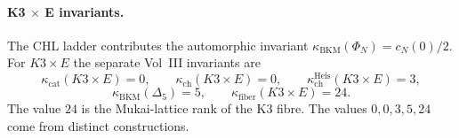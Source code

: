\paragraph{K3 \texorpdfstring{$\times$}{x} E invariants.}
The CHL ladder contributes the automorphic invariant
\(\kappa_{\mathrm{BKM}}(\Phi_N)=c_N(0)/2\). For \(K3\times E\) the
separate Vol~III invariants are
\[
  \kappa_{\mathrm{cat}}(K3\times E)=0,\qquad
  \kappa_{\mathrm{ch}}(K3\times E)=0,\qquad
  \kappa_{\mathrm{ch}}^{\mathrm{Heis}}(K3\times E)=3,
\]
\[
  \kappa_{\mathrm{BKM}}(\Delta_5)=5,\qquad
  \kappa_{\mathrm{fiber}}(K3\times E)=24.
\]
The value \(24\) is the Mukai-lattice rank of the K3 fibre. The values
\(0,0,3,5,24\) come from distinct constructions.
